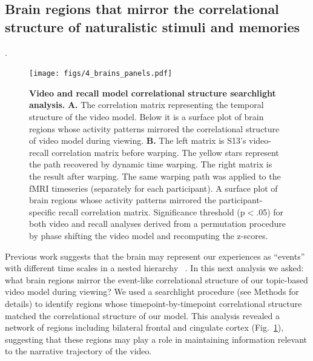 \documentclass{article}
\begin{document}
\subsection*{Brain regions that mirror the correlational structure of naturalistic stimuli and memories}.
\begin{figure}[tp]
\centering
\texttt{[image: figs/4\_brains\_panels.pdf]}
\caption{\small \textbf{Video and recall model correlational structure searchlight analysis.} \textbf{A.} The correlation matrix representing the temporal structure of the video model. Below it is a surface plot of brain regions whose activity patterns mirrored the correlational structure of video model during viewing.  \textbf{B.} The left matrix is S13's video-recall correlation matrix before warping. The yellow stars represent the path recovered by dynamic time warping. The right matrix is the result after warping. The same warping path was applied to the fMRI timeseries (separately for each participant). A surface plot of brain regions whose activity patterns mirrored the participant-specific recall correlation matrix. Significance threshold (p$<$.05) for both video and recall analyses derived from a permutation procedure by phase shifting the video model and recomputing the z-scores.}
\label{fig:brainz}
\end{figure}

Previous work suggests that the brain may represent our experiences as ``events'' with different time scales in a nested hierarchy ~\citep{LernEtal11, ChenEtal17, BaldEtal17}. In this next analysis we asked: what brain regions mirror the event-like correlational structure of our topic-based video model during viewing? We used a searchlight procedure (see Methods for details) to identify regions whose timepoint-by-timepoint correlational structure matched the correlational structure of our model. This analysis revealed a network of regions including bilateral frontal and cingulate cortex (Fig.~\ref{fig:brainz}), suggesting that these regions may play a role in maintaining information relevant to the narrative trajectory of the video.
\end{document}
